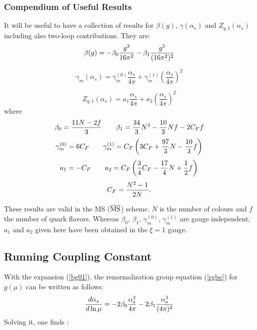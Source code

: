 \documentclass[12pt]{article}
\def\as{\alpha_s}
\newcommand{\be}{\begin{equation}}
\newcommand{\ee}{\end{equation}}
\def\aspi{\frac{\as}{4\pi}}
\begin{document}
\begin{itemize}
\subsubsection{Compendium of Useful Results}
It will be useful to have a collection of results for $\beta(g)$, 
$\gamma(\alpha_s)$ and $Z_{q,1}(\alpha_s)$ including also 
two-loop contributions.
They are:
\begin{equation}\label{bg01}
\beta(g)=-\beta_0{g^3\over 16\pi^2}-\beta_1{g^5\over (16\pi^2)^2}
  \end{equation}

\begin{equation}\label{gama}
\gamma_m(\as)=\gamma^{(0)}_{m}\aspi + \gamma^{(1)}_{m}\left(\aspi\right)^2
\end{equation}

\begin{equation}\label{zq1a} 
Z_{q, 1}(\as)=a_1\aspi + a_2\left(\aspi\right)^2
\end{equation}
where
\begin{equation}\label{b0b1}
\beta_0={{11N-2f}\over 3}\qquad
\beta_1={34\over 3}N^2-{10\over 3}Nf-2C_F f
\ee
\begin{equation}\label{gm01} \gamma^{(0)}_{m}
=6C_F\qquad \gamma^{(1)}_{m}=C_F\left(
     3C_F+{97\over 3}N-{10\over 3}f\right)  \end{equation}
\begin{equation}\label{a1a2} a_1=-C_F\qquad a_2=C_F\left(
     {3\over 4}C_F-{17\over 4}N+{1\over 2}f\right)  
\end{equation}
\be
C_F={{N^2-1}\over{2N}}.
\end{equation}

These results are valid in the MS ($\overline{\rm MS}$) scheme.
$N$ is the number of colours and $f$ the number of quark flavors.
Whereas $\beta_0$, $\beta_1$, $\gamma_m^{(0)}$, $\gamma_m^{(1)}$
are gauge independent, $a_1$ and $a_2$ given here have been obtained
in the $\xi=1$ gauge.


\subsection{Running Coupling Constant}
With the expansion (\ref{bg01}), the renormalization group equation 
(\ref{rgbe}) for $g(\mu)$ can be written as follows:
\begin{equation}\label{rga}
{d\as\over d\ln\mu}=-2\beta_0 {\as^2\over 4\pi}-2\beta_1
  {\as^3\over(4\pi)^2}  \end{equation}
Solving it, one finds \cite{BBDM}:


\end{itemize}
\end{document}
